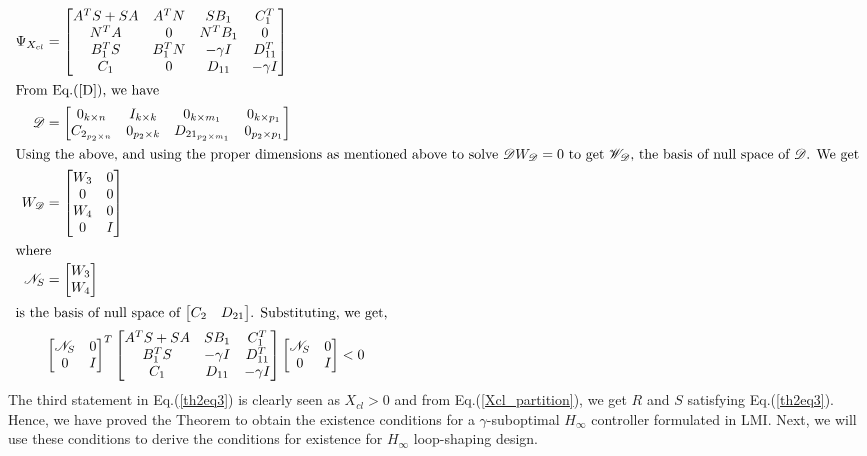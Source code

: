 \documentclass[a4paper,12pt]{article}
\begin{document}
	\begin{align}
	\Psi_{X_{cl}} &= \begin{bmatrix}
	A^{T}S + SA & A^{T}N & SB_{1} & C_{1}^{T} \\
	N^{T}A & 0 & N^{T}B_{1} & 0 \\
	B_{1}^{T}S & B_{1}^{T}N & -\gamma I & D_{11}^{T} \\
	C_{1} & 0 & D_{11} & -\gamma I
	\end{bmatrix} \\
	\intertext{From Eq.(\ref{D}), we have}
	\mathscr{D} &= \begin{bmatrix}
	0_{k \times n} & I_{k \times k} & 0_{k \times m_{1}} & 0_{k \times p_{1}} \\
	C_{2_{p_{2} \times n}} & 0_{p_{2} \times k} & D_{21_{p_{2} \times m_{1}}} & 0_{p_{2} \times p_{1}}
	\end{bmatrix}\\
	\intertext{Using the above, and using the proper dimensions as mentioned above to solve $\mathscr{D}W_{\mathscr{D}} = 0$ to get $\mathscr{W}_{\mathscr{D}}$, the basis of null space of $\mathscr{D}$. We get}
	W_{\mathscr{D}} &= \begin{bmatrix}
	W_{3} & 0 \\
	0 & 0 \\
	W_{4} & 0 \\
	0 & I
	\end{bmatrix} \\
	\intertext{where}
	\mathscr{N}_{S} &= \begin{bmatrix}
	W_{3} \\ W_{4}
	\end{bmatrix}\\
	\intertext{is the basis of null space of $\begin{bmatrix}
	C_{2} & D_{21}
	\end{bmatrix}$. Substituting, we get,}
	&\begin{bmatrix}
	\mathscr{N}_{S} & 0 \\
	0 & I
	\end{bmatrix}^{T}
	\begin{bmatrix}
	A^{T}S+SA & SB_{1} & C_{1}^{T} \\
	B_{1}^{T}S & -\gamma I & D_{11}^{T} \\
	C_{1} & D_{11} & -\gamma I
	\end{bmatrix}
	\begin{bmatrix}
	\mathscr{N}_{S} & 0 \\ 
	0 & I
	\end{bmatrix} <0
	\end{align}	 
	The third statement in Eq.(\ref{th2eq3}) is clearly seen as $X_{cl}>0$ and from Eq.(\ref{Xcl_partition}), we get $R$ and $S$ satisfying Eq.(\ref{th2eq3}). Hence, we have proved the Theorem to obtain the existence conditions for a $\gamma$-suboptimal $H_{\infty}$ controller formulated in LMI. Next, we will use these conditions to derive the conditions for existence for $H_{\infty}$ loop-shaping design.
\end{document}
